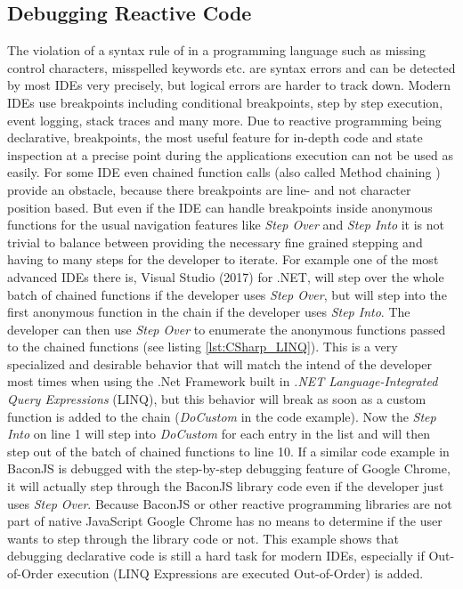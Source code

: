\subsection{Debugging Reactive Code}
The violation of a syntax rule of in a programming language such as missing control characters, misspelled keywords etc. are syntax errors and can be detected by most IDEs very precisely, but logical errors are harder to track down. Modern IDEs use breakpoints including conditional breakpoints, step by step execution, event logging, stack traces and many more. Due to reactive programming being declarative, breakpoints, the most useful feature for in-depth code and state inspection at a precise point during the applications execution can not be used as easily. For some IDE even chained function calls (also called Method chaining \cite{MethodChaining}) provide an obstacle, because there breakpoints are line- and not character position based. But even if the IDE can handle breakpoints inside anonymous functions for the usual navigation features like \emph{Step Over} and \emph{Step Into} it is not trivial to balance between providing the necessary fine grained stepping and having to many steps for the developer to iterate. For example one of the most advanced IDEs there is, Visual Studio (2017) for .NET, will step over the whole batch of chained functions if the developer uses \emph{Step Over}, but will step into the first anonymous function in the chain if the developer uses \emph{Step Into}. The developer can then use \emph{Step Over} to enumerate the anonymous functions passed to the chained functions (see listing \ref{lst:CSharp_LINQ}). This is a very specialized and desirable behavior that will match the intend of the developer most times when using the .Net Framework built in \emph{.NET Language-Integrated Query Expressions} (LINQ), but this behavior will break as soon as a custom function is added to the chain (\emph{DoCustom} in the code example). Now the \emph{Step Into} on line 1 will step into \emph{DoCustom} for each entry in the list and will then step out of the batch of chained functions to line 10. If a similar code example in BaconJS is debugged with the step-by-step debugging feature of Google Chrome, it will actually step through the BaconJS library code even if the developer just uses \emph{Step Over}. Because BaconJS or other reactive programming libraries are not part of native JavaScript Google Chrome has no means to determine if the user wants to step through the library code or not.
This example shows that debugging declarative code is still a hard task for modern IDEs, especially if Out-of-Order execution (LINQ Expressions are executed Out-of-Order) is added.
